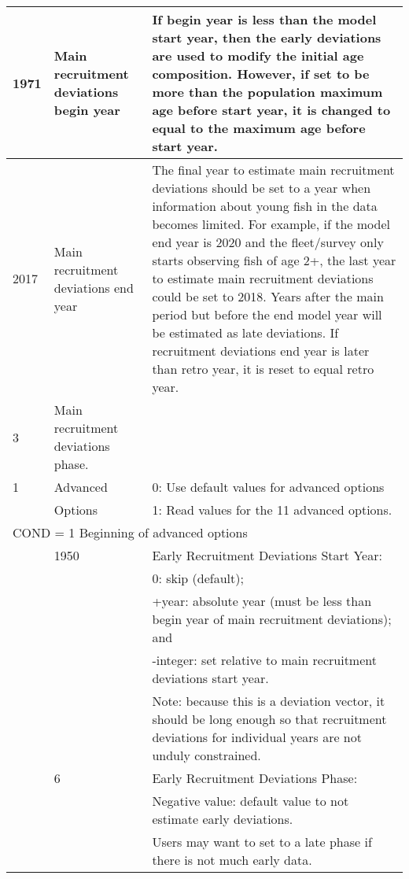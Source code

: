 \begin{longtable}{p{1cm} p{3cm} p{12cm}}
	1971 \Tstrut & Main recruitment deviations begin year & If begin year is less than the model start year, then the early deviations are used to modify the initial age composition. However, if set to be more than the population maximum age before start year, it is changed to equal to the maximum age before start year. \Bstrut\\
	\hline

	2017 \Tstrut & \hypertarget{RecDevEndYear}{Main recruitment deviations end year} & The final year to estimate main recruitment deviations should be set to a year when information about young fish in the data becomes limited. For example, if the model end year is 2020 and the fleet/survey only starts observing fish of age 2+, the last year to estimate main recruitment deviations could be set to 2018. Years after the main period but before the end model year will be estimated as late deviations. If recruitment deviations end year is later than retro year, it is reset to equal retro year. \Bstrut\\
	\hline

	3 \Tstrut & Main recruitment deviations phase. & \Bstrut\\
	\hline

	1 \Tstrut & Advanced & 0: Use default values for advanced options \\ 
	& Options & 1: Read values for the 11 advanced options. \Bstrut\\
	\hline

	\multicolumn{3}{l}{COND = 1 Beginning of advanced options} \Tstrut\Bstrut\\
	& 1950 & Early Recruitment Deviations Start Year: \\
	& & 0: skip (default); \\
	& & +year: absolute year (must be less than begin year of main recruitment deviations); and \\
	& & -integer: set relative to main recruitment deviations start year. \\
	& & Note: because this is a deviation vector, it should be long enough so that recruitment deviations for individual years are not unduly constrained. \\

	\Tstrut & 6 & Early Recruitment Deviations Phase: \\
	& & Negative value: default value to not estimate early deviations. \\
	& & Users may want to set to a late phase if there is not much early data. \\
	

\end{longtable}
